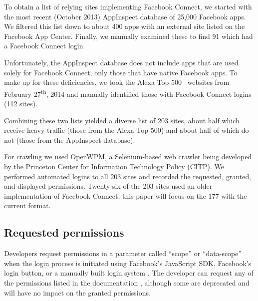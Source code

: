 \documentclass[10pt]{sig-alternate-10pt}
\begin{document}
To obtain a list of relying sites implementing Facebook Connect, we started with the most recent (October 2013) AppInspect \cite{appinspect} database of 25,000 Facebook apps.
We filtered this list down to about 400 apps with an external site listed on the Facebook App Center.
Finally, we manually examined these to find 91 which had a Facebook Connect login.

Unfortunately, the AppInspect database does not include apps that are used solely for Facebook Connect, only those that have native Facebook apps. 
To make up for these deficiencies, we took the Alexa Top 500~\cite{alexa} websites from February 27\textsuperscript{th}, 2014 and manually identified those with Facebook Connect logins (112 sites). 

Combining these two lists yielded a diverse list of 203 sites, about half which receive heavy traffic (those from the Alexa Top 500) and about half of which do not (those from the AppInspect database).

For crawling we used OpenWPM, a Selenium-based web crawler being developed by the Princeton Center for Information Technology Policy (CITP). 
We performed automated logins to all 203 sites and recorded the requested, granted, and displayed permissions.
Twenty-six of the 203 sites used an older implementation of Facebook Connect; this paper will focus on the 177 with the current format.

\subsection{Requested permissions}

Developers request permissions in a parameter called ``scope'' or ``data-scope'' when the login process is initiated using Facebook's JavaScript SDK, Facebook's login button, or a manually built login system \cite{fbpermsinstructions}.
The developer can request any of the permissions listed in the documentation \cite{fbpermissions}, although some are deprecated and will have no impact on the granted permissions.%
\end{document}
